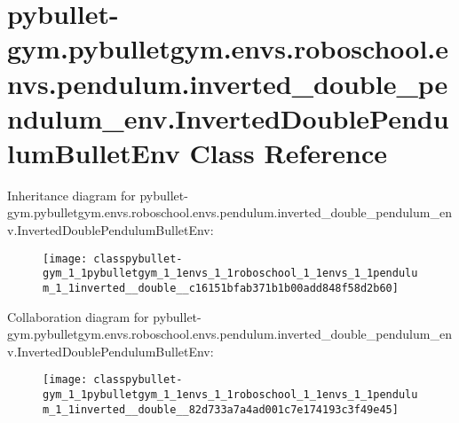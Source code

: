 \hypertarget{classpybullet-gym_1_1pybulletgym_1_1envs_1_1roboschool_1_1envs_1_1pendulum_1_1inverted__double__02ae3ce2c545b467956bc876f69901b4}{}\section{pybullet-\/gym.pybulletgym.\+envs.\+roboschool.\+envs.\+pendulum.\+inverted\+\_\+double\+\_\+pendulum\+\_\+env.\+Inverted\+Double\+Pendulum\+Bullet\+Env Class Reference}
\label{classpybullet-gym_1_1pybulletgym_1_1envs_1_1roboschool_1_1envs_1_1pendulum_1_1inverted__double__02ae3ce2c545b467956bc876f69901b4}


Inheritance diagram for pybullet-\/gym.pybulletgym.\+envs.\+roboschool.\+envs.\+pendulum.\+inverted\+\_\+double\+\_\+pendulum\+\_\+env.\+Inverted\+Double\+Pendulum\+Bullet\+Env\+:
\nopagebreak
\begin{figure}[H]
\begin{center}
\leavevmode
\texttt{[image: classpybullet-gym\_1\_1pybulletgym\_1\_1envs\_1\_1roboschool\_1\_1envs\_1\_1pendulum\_1\_1inverted\_\_double\_\_c16151bfab371b1b00add848f58d2b60]}
\end{center}
\end{figure}


Collaboration diagram for pybullet-\/gym.pybulletgym.\+envs.\+roboschool.\+envs.\+pendulum.\+inverted\+\_\+double\+\_\+pendulum\+\_\+env.\+Inverted\+Double\+Pendulum\+Bullet\+Env\+:
\nopagebreak
\begin{figure}[H]
\begin{center}
\leavevmode
\texttt{[image: classpybullet-gym\_1\_1pybulletgym\_1\_1envs\_1\_1roboschool\_1\_1envs\_1\_1pendulum\_1\_1inverted\_\_double\_\_82d733a7a4ad001c7e174193c3f49e45]}
\end{center}
\end{figure}
